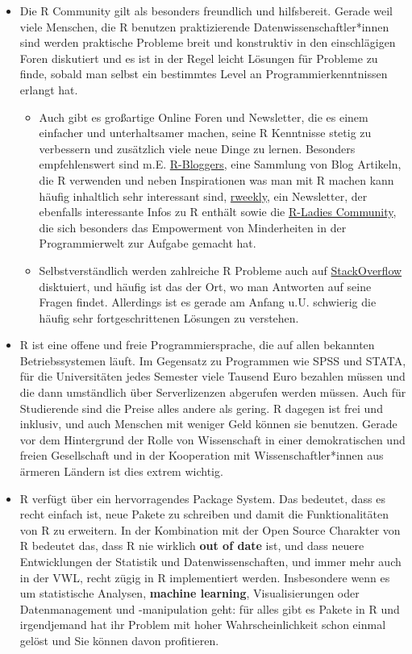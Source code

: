 \documentclass[]{tufte-book}
\providecommand{\tightlist}{%
  \setlength{\itemsep}{0pt}\setlength{\parskip}{0pt}}
\begin{document}
\begin{itemize}
\item
  Die R Community gilt als besonders freundlich und hilfsbereit. Gerade
  weil viele Menschen, die R benutzen praktizierende
  Datenwissenschaftler*innen sind werden praktische Probleme breit und
  konstruktiv in den einschlägigen Foren diskutiert und es ist in der
  Regel leicht Lösungen für Probleme zu finde, sobald man selbst ein
  bestimmtes Level an Programmierkenntnissen erlangt hat.

  \begin{itemize}
  \tightlist
  \item
    Auch gibt es großartige Online Foren und Newsletter, die es einem
    einfacher und unterhaltsamer machen, seine R Kenntnisse stetig zu
    verbessern und zusätzlich viele neue Dinge zu lernen. Besonders
    empfehlenswert sind m.E.
    \href{https://www.r-bloggers.com/}{R-Bloggers}, eine Sammlung von
    Blog Artikeln, die R verwenden und neben Inspirationen was man mit R
    machen kann häufig inhaltlich sehr interessant sind,
    \href{https://rweekly.org/}{rweekly}, ein Newsletter, der ebenfalls
    interessante Infos zu R enthält sowie die
    \href{https://rladies.org/}{R-Ladies Community}, die sich besonders
    das Empowerment von Minderheiten in der Programmierwelt zur Aufgabe
    gemacht hat.
  \item
    Selbstverständlich werden zahlreiche R Probleme auch auf
    \href{https://stackoverflow.com/tags/r/info}{StackOverflow}
    disktuiert, und häufig ist das der Ort, wo man Antworten auf seine
    Fragen findet. Allerdings ist es gerade am Anfang u.U. schwierig die
    häufig sehr fortgeschrittenen Lösungen zu verstehen.
  \end{itemize}
\item
  R ist eine offene und freie Programmiersprache, die auf allen
  bekannten Betriebssystemen läuft. Im Gegensatz zu Programmen wie SPSS
  und STATA, für die Universitäten jedes Semester viele Tausend Euro
  bezahlen müssen und die dann umständlich über Serverlizenzen abgerufen
  werden müssen. Auch für Studierende sind die Preise alles andere als
  gering. R dagegen ist frei und inklusiv, und auch Menschen mit weniger
  Geld können sie benutzen. Gerade vor dem Hintergrund der Rolle von
  Wissenschaft in einer demokratischen und freien Gesellschaft und in
  der Kooperation mit Wissenschaftler*innen aus ärmeren Ländern ist dies
  extrem wichtig.
\item
  R verfügt über ein hervorragendes Package System. Das bedeutet, dass
  es recht einfach ist, neue Pakete zu schreiben und damit die
  Funktionalitäten von R zu erweitern. In der Kombination mit der Open
  Source Charakter von R bedeutet das, dass R nie wirklich \textbf{out
  of date} ist, und dass neuere Entwicklungen der Statistik und
  Datenwissenschaften, und immer mehr auch in der VWL, recht zügig in R
  implementiert werden. Insbesondere wenn es um statistische Analysen,
  \textbf{machine learning}, Visualisierungen oder Datenmanagement und
  -manipulation geht: für alles gibt es Pakete in R und irgendjemand hat
  ihr Problem mit hoher Wahrscheinlichkeit schon einmal gelöst und Sie
  können davon profitieren.


\end{itemize}
\end{document}
